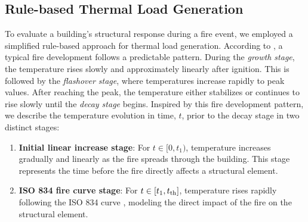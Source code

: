 \subsection{Rule-based Thermal Load Generation}
\label{subsec:thermal_load_generation}
To evaluate a building's structural response during a fire event, we employed a simplified rule-based approach for thermal load generation. 
According to \cite{spearpoint_fire_2008}, a typical fire development follows a predictable pattern. During the {\em{growth stage}}, the temperature rises slowly and approximately linearly after ignition. This is followed by the {\em{flashover stage}}, where temperatures increase rapidly to peak values. After reaching the peak, the temperature either stabilizes or continues to rise slowly until the {\em{decay stage}} begins. Inspired by this fire development pattern, we describe the temperature evolution in time, $t$, prior to the decay stage in two distinct stages:
\begin{enumerate}
    \item {\bf{Initial linear increase stage}}: For $t \in [0, t_1)$, temperature increases gradually and linearly as the fire spreads through the building. This stage represents the time before the fire directly affects a structural element.  
    \item {\bf{ISO 834 fire curve stage}}: For $t \in [t_1, t_{\text{th}}]$, temperature rises rapidly following the ISO 834 curve \cite{ISO834}, modeling the direct impact of the fire on the structural element. 
\end{enumerate}
